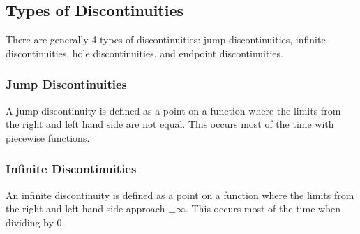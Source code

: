 \documentclass{article}
\begin{document}
\subsection{Types of Discontinuities}
There are generally 4 types of discontinuities: jump discontinuities, infinite discontinuities, hole discontinuities, and endpoint discontinuities. 

\subsubsection*{Jump Discontinuities}
A jump discontinuity is defined as a point on a function where the limits from the right and left hand side are not equal. This occurs most of the time with piecewise functions.

\begin{center}
\end{center}

\subsubsection*{Infinite Discontinuities}
An infinite discontinuity is defined as a point on a function where the limits from the right and left hand side approach $\pm\infty$. This occurs most of the time when dividing by $0$.

\begin{center}
\end{center}
\end{document}
